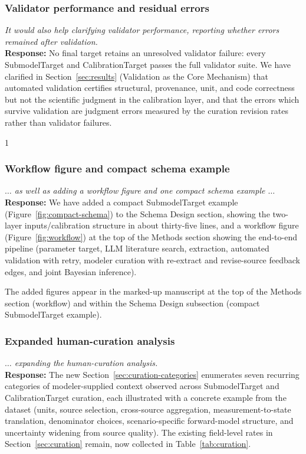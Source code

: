 \documentclass[11pt]{article}
\newcommand{\reviewer}[1]{\textcolor{reviewercolor}{\textit{#1}}}
\newcommand{\response}[1]{\textcolor{responsecolor}{\textbf{Response:} #1}}
\providecommand{\trackchanges}{1}
\newenvironment{revised}{\if1\trackchanges\color{blue}\fi}{}
\begin{document}
\subsubsection*{Validator performance and residual errors}
\reviewer{It would also help clarifying validator performance, reporting whether errors remained after validation.}\\
\response{No final target retains an unresolved validator failure: every SubmodelTarget and CalibrationTarget passes the full validator suite. We have clarified in Section~\ref{sec:results} (Validation as the Core Mechanism) that automated validation certifies structural, provenance, unit, and code correctness but not the scientific judgment in the calibration layer, and that the errors which survive validation are judgment errors measured by the curation revision rates rather than validator failures.}

\begin{revised}

\end{revised}

\subsubsection*{Workflow figure and compact schema example}
\reviewer{$\ldots$ as well as adding a workflow figure and one compact schema example $\ldots$}\\
\response{We have added a compact SubmodelTarget example (Figure~\ref{fig:compact-schema}) to the Schema Design section, showing the two-layer inputs/calibration structure in about thirty-five lines, and a workflow figure (Figure~\ref{fig:workflow}) at the top of the Methods section showing the end-to-end pipeline (parameter target, LLM literature search, extraction, automated validation with retry, modeler curation with re-extract and revise-source feedback edges, and joint Bayesian inference).}

\medskip

The added figures appear in the marked-up manuscript at the top of the Methods section (workflow) and within the Schema Design subsection (compact SubmodelTarget example).

\subsubsection*{Expanded human-curation analysis}
\reviewer{$\ldots$ expanding the human-curation analysis.}\\
\response{The new Section~\ref{sec:curation-categories} enumerates seven recurring categories of modeler-supplied context observed across SubmodelTarget and CalibrationTarget curation, each illustrated with a concrete example from the dataset (units, source selection, cross-source aggregation, measurement-to-state translation, denominator choices, scenario-specific forward-model structure, and uncertainty widening from source quality). The existing field-level rates in Section~\ref{sec:curation} remain, now collected in Table~\ref{tab:curation}.}
\end{document}
